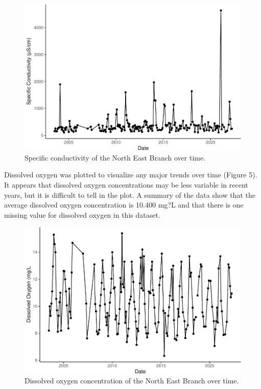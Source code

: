 \documentclass[
  12pt,
]{article}
\begin{document}
\begin{figure}

\includegraphics{Project_Template_files/figure-latex/Specific conductivity over time-1} \hfill{}

\caption{Specific conductivity of the North East Branch over time.}\label{fig:Specific conductivity over time}
\end{figure}

\newpage

Dissolved oxygen was plotted to visualize any major trends over time
(Figure 5). It appears that dissolved oxygen concentrations may be less
variable in recent years, but it is difficult to tell in the plot. A
summary of the data show that the average dissolved oxygen concentration
is 10.400 mg?L and that there is one missing value for dissolved oxygen
in this dataset.

\begin{figure}

\includegraphics{Project_Template_files/figure-latex/Dissolved oxygen over time-1} \hfill{}

\caption{Dissolved oxygen concentration of the North East Branch over time.}\label{fig:Dissolved oxygen over time}
\end{figure}
\end{document}
